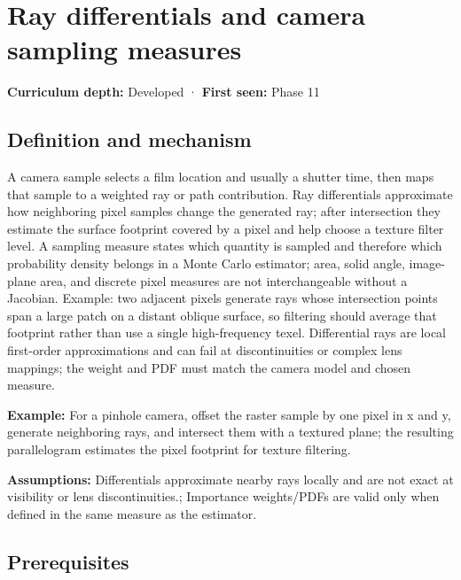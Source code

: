 \hypertarget{appendix-8c40fad29462}{}\label{referencestart:appendix-8c40fad29462}
\section{Ray differentials and camera sampling measures}\label{appendix-8c40fad29462-ray-differentials-and-camera-sampling-measures}

\textbf{Curriculum depth:} Developed · \textbf{First seen:} Phase 11

\begin{allmightroledefinition}

\subsection{Definition and mechanism}\label{appendix-8c40fad29462-definition-and-mechanism}

A camera sample selects a film location and usually a shutter time, then maps that sample to a weighted ray or path contribution. Ray differentials approximate how neighboring pixel samples change the generated ray; after intersection they estimate the surface footprint covered by a pixel and help choose a texture filter level. A sampling measure states which quantity is sampled and therefore which probability density belongs in a Monte Carlo estimator; area, solid angle, image-plane area, and discrete pixel measures are not interchangeable without a Jacobian. Example: two adjacent pixels generate rays whose intersection points span a large patch on a distant oblique surface, so filtering should average that footprint rather than use a single high-frequency texel. Differential rays are local first-order approximations and can fail at discontinuities or complex lens mappings; the weight and PDF must match the camera model and chosen measure.

\end{allmightroledefinition}

\textbf{Example:} For a pinhole camera, offset the raster sample by one pixel in x and y, generate neighboring rays, and intersect them with a textured plane; the resulting parallelogram estimates the pixel footprint for texture filtering.

\textbf{Assumptions:} Differentials approximate nearby rays locally and are not exact at visibility or lens discontinuities.; Importance weights/PDFs are valid only when defined in the same measure as the estimator.

\subsection{Prerequisites}\label{appendix-8c40fad29462-prerequisites}

